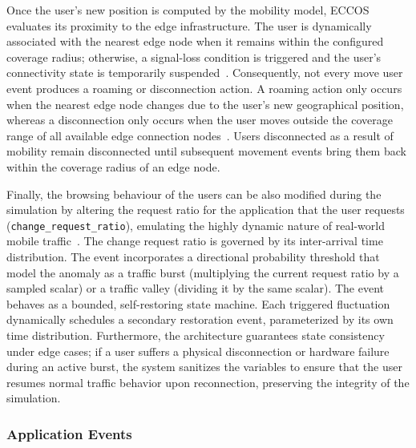 \documentclass[ASNA]{USG} %
\begin{document}
Once the user's new position is computed by the mobility model, \textsc{ECCOS} evaluates its proximity to the edge infrastructure. The user is dynamically associated with the nearest edge node when it remains within the configured coverage radius; otherwise, a signal-loss condition is triggered and the user's connectivity state is temporarily suspended~\cite{Qiu2025Mobility}. Consequently, not every move user event produces a roaming or disconnection action. A roaming action only occurs when the nearest edge node changes due to the user's new geographical position, whereas a disconnection only occurs when the user moves outside the coverage range of all available edge connection nodes~\cite{Loutfi2024An}. Users disconnected as a result of mobility remain disconnected until subsequent movement events bring them back within the coverage radius of an edge node.

Finally, the browsing behaviour of the users can be also modified during the simulation by altering the request ratio for the application that the user requests (\texttt{change\_request\_ratio}), emulating the highly dynamic nature of real-world mobile traffic~\cite{Li2023Estimating}. The change request ratio is governed by its inter-arrival time distribution. The event incorporates a directional probability threshold that model the anomaly as a traffic burst (multiplying the current request ratio by a sampled scalar) or a traffic valley (dividing it by the same scalar). The event behaves as a bounded, self-restoring state machine. Each triggered fluctuation dynamically schedules a secondary restoration event, parameterized by its own time distribution. Furthermore, the architecture guarantees state consistency under edge cases; if a user suffers a physical disconnection or hardware failure during an active burst, the system sanitizes the variables to ensure that the user resumes normal traffic behavior upon reconnection, preserving the integrity of the simulation.



\subsubsection{Application Events}
\label{sect_applicationevents}
\end{document}
